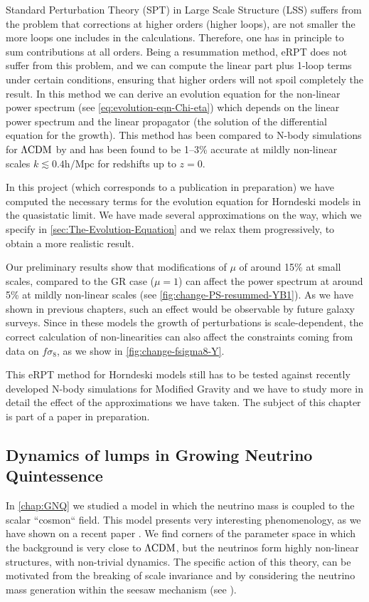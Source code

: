 Standard Perturbation Theory (SPT) in Large Scale Structure (LSS) suffers from the problem that corrections at higher orders (higher loops),
are not smaller the more loops one includes in the calculations. Therefore, one has in principle to sum contributions at all orders.
Being a resummation method, eRPT does not suffer from this problem, and we can compute the linear part plus 1-loop terms under certain conditions, ensuring that
higher orders will not spoil completely the result.
In this method we can derive an evolution equation for the non-linear power spectrum (see \cref{eq:evolution-eqn-Chi-eta}) which
depends on the linear power spectrum and the linear propagator (the solution of the differential equation for the growth).
This method has been compared to N-body simulations for $\Lambda\mathrm{CDM}$ by \cite{anselmi_nonlinear_2012} and has been found to be 1--3\% accurate at mildly non-linear 
scales $k \lesssim 0.4 \mathrm{h/Mpc}$ for redshifts up to $z=0$.

In this project (which corresponds to a publication in preparation) we have computed the necessary terms for the evolution equation
for Horndeski models in the quasistatic limit. 
We have made several approximations on the way, which we specify in \cref{sec:The-Evolution-Equation} and we relax them progressively, to 
obtain a more realistic result.

Our preliminary results show that modifications of $\mu$ of around 15\% at small scales, compared to the GR case ($\mu=1$)
can affect the power spectrum at around 5\% at mildly non-linear scales (see \cref{fig:change-PS-resummed-YB1}).
As we have shown in previous chapters, such an effect would be observable by future galaxy surveys.
Since in these models the growth of perturbations is scale-dependent,
the correct calculation of non-linearities can also affect the constraints coming from data on $f\sigma_8$,
as we show in \cref{fig:change-fsigma8-Y}.

This eRPT method for Horndeski models still has to be tested against recently developed N-body simulations for Modified Gravity and we have to
study more in detail the effect of the approximations we have taken.
The subject of this chapter is part of a paper in preparation.


\subsection*{Dynamics of lumps in Growing Neutrino Quintessence}

In \cref{chap:GNQ} we studied a model in which the neutrino mass is coupled to the scalar ``cosmon`` field.
This model presents very interesting phenomenology, as we have shown on a recent paper \cite{casas_dynamics_2016-1}. We find corners of the
parameter space in which the background is very close to $\Lambda\mathrm{CDM}$, but
the neutrinos form highly non-linear structures, with non-trivial dynamics.
The specific action of this theory, can be motivated from the breaking
of scale invariance and by considering the neutrino mass generation within the seesaw mechanism (see \cite{wetterich_growing_2007}).

